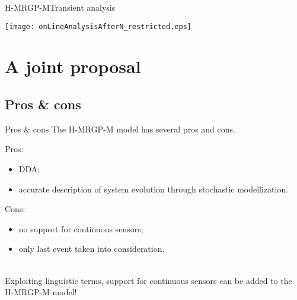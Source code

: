\documentclass[9pt, handout]{beamer}
\begin{document}
      \begin{frame}{H-MRGP-M}{Transient analysis}
        \begin{center}
          \texttt{[image: onLineAnalysisAfterN\_restricted.eps]}
        \end{center}
      \end{frame}
      
  \section{A joint proposal}
    \subsection{Pros \& cons}
      \begin{frame}{Pros \& cons}
        \pause
        The H-MRGP-M model has several pros and cons.\\
        \pause
        \vspace{1em}
        \begin{minipage}{0.4\linewidth}
          Pros:
          \begin{itemize}
            \item DDA;
            \item accurate description of system evolution through stochastic modellization.
          \end{itemize}
        \end{minipage}
        \pause
        \begin{minipage}{0.4\linewidth}
          Cons:
          \begin{itemize}
            \item no support for continuous sensors;
            \item only last event taken into consideration.
          \end{itemize}
        \end{minipage}\\
        \vspace{2em}
        Exploiting linguistic terms, support for continuous sensors can be added to the H-MRGP-M model!
      \end{frame}
    
\end{document}
